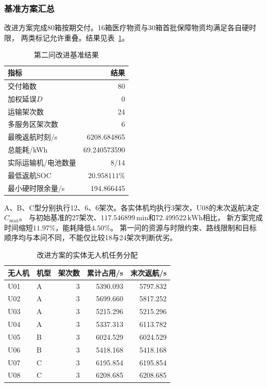 \documentclass[bwprint]{gmcmthesis}
\begin{document}
\subsubsection{基准方案汇总}
改进方案完成80箱按期交付。16箱医疗物资与30箱首批保障物资均满足各自硬时限，
两类标记允许重叠。结果见表~\ref{tab:q2_summary}。
\begin{table}[htbp]
\centering
\small
\caption{第二问改进基准结果}
\label{tab:q2_summary}
\begin{tabular}{lr}
\toprule
指标 & 结果 \\
\midrule
交付箱数 & 80 \\
加权延误$D$ & 0 \\
运输架次数 & 24 \\
多服务区架次数 & 6 \\
最晚返航时刻/s & 6208.684865 \\
总能耗/kWh & 69.240573590 \\
实际运输机/电池数量 & 8/14 \\
最低返航SOC & $20.958111\%$ \\
最小硬时限余量/s & 194.866445 \\
\bottomrule
\end{tabular}
\end{table}
A、B、C型分别执行12、6、6架次。各实体机均执行3架次，U08的末次返航决定$C_{\max}$。
与初始基准的27架次、$117.546899\,\mathrm{min}$和$72.499522\,\mathrm{kWh}$相比，
新方案完成时间缩短$11.97\%$，能耗降低$4.50\%$。
第一问的资源与时限约束、路线限制和目标顺序均与本问不同，不能仅比较18与24架次判断优劣。
\begin{table}[htbp]
\centering
\small
\caption{改进方案的实体无人机任务分配}
\label{tab:q2_units}
\begin{tabular}{llrrr}
\toprule
无人机 & 机型 & 架次数 & 累计占用/s & 末次返航/s \\
\midrule
U01 & A & 3 & 5390.093 & 5797.832 \\
U02 & A & 3 & 5699.660 & 5817.252 \\
U03 & A & 3 & 5215.296 & 5215.296 \\
U04 & A & 3 & 5337.313 & 6113.782 \\
U05 & B & 3 & 6024.529 & 6024.529 \\
U06 & B & 3 & 5418.168 & 5418.168 \\
U07 & C & 3 & 6195.854 & 6195.854 \\
U08 & C & 3 & 6208.685 & 6208.685 \\
\bottomrule
\end{tabular}
\end{table}
\end{document}
